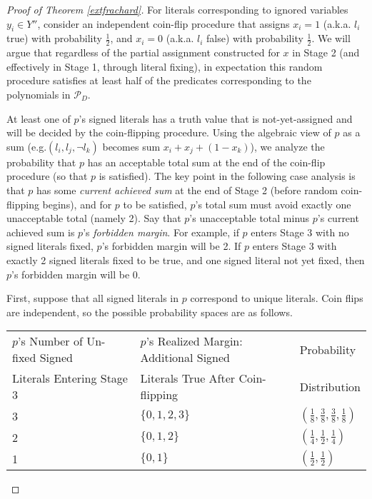 \documentclass{article}
\begin{document}
\begin{proof}[Proof of Theorem \ref{extfrachard}]
For literals corresponding to ignored variables $y_i\in Y''$, consider an independent coin-flip procedure that assigns $x_i=1$ (a.k.a. $l_i$ true) with probability $\frac{1}{2}$, and $x_i=0$ (a.k.a. $l_i$ false) with probability $\frac{1}{2}$. 
We will argue that regardless of the partial assignment constructed for $x$ in Stage 2 (and effectively in Stage 1, through literal fixing), in expectation this random procedure satisfies at least half of the predicates corresponding to the polynomials in $\mathcal{P}_D$. 


At least one of $p$'s signed literals has a truth value that is not-yet-assigned and will be decided by the coin-flipping procedure. Using the algebraic view of $p$ as a sum (e.g.$(l_i,l_j,\neg l_k)$ becomes sum $x_i+x_j+(1-x_k)$), we
analyze the probability that $p$ has an acceptable total sum at the end of the coin-flip procedure (so that $p$ is satisfied). The key point in the following case analysis is that $p$ has some \textit{current achieved sum} at the end of Stage 2 (before random coin-flipping begins), and for $p$ to be satisfied, $p$'s total sum must avoid exactly one unacceptable total (namely 2). Say that $p$'s unacceptable total minus $p$'s current achieved sum is $p$'s \textit{forbidden margin}. For example, if $p$ enters Stage 3 with no signed literals fixed, $p$'s forbidden margin will be 2. If $p$ enters Stage 3 with exactly 2 signed literals fixed to be true, and one signed literal not yet fixed, then $p$'s forbidden margin will be 0.  

First, suppose that all signed literals in $p$ correspond to unique literals. Coin flips are independent, so the possible probability spaces are as follows.

\renewcommand\arraystretch{1.2} 

\begin{tabular}{|l|l|l|} \hline
$p$'s Number of Un-fixed Signed  & $p$'s Realized Margin: Additional Signed  & Probability  \\
Literals Entering Stage 3 & Literals True After Coin-flipping& Distribution  \\
\hline
3 & $\{0,1,2,3\}$& $(\frac{1}{8},\frac{3}{8},\frac{3}{8},\frac{1}{8})$\\ 
\hline
2 & $\{0,1,2\}$& $(\frac{1}{4},\frac{1}{2},\frac{1}{4})$\\ 
\hline
1 & $\{0,1\}$& $(\frac{1}{2},\frac{1}{2})$\\ 
\hline
\end{tabular}

\vspace{2mm}


\end{proof}
\end{document}
